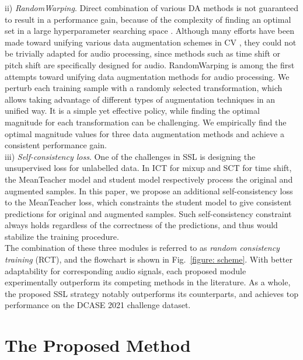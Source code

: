 \documentclass[a4paper]{article}
\begin{document}
\indent ii) \emph{RandomWarping}. Direct combination of various DA methods is not guaranteed to result in a performance gain, because of the complexity of finding an optimal set in a large hyperparameter searching space \cite{shorten2019survey}. Although many efforts have been made toward unifying various data augmentation schemes in CV \cite{cubuk2019autoaugment, cubuk2020randaugment}, they could not be trivially adapted for audio processing, since methods such as time shift \cite{koh2021sound} or pitch shift \cite{mcfee2015software} are specifically designed for audio. RandomWarping is among the first attempts toward unifying data augmentation methods for audio processing. We perturb each training sample with a randomly selected transformation, which allows taking advantage of different types of augmentation techniques in an unified way. It is a simple yet effective policy, while finding the optimal magnitude for each transformation can be challenging. We empirically find the optimal magnitude values for three data augmentation methods and achieve a consistent performance gain. \\
\indent iii) \emph{Self-consistency loss}. One of the challenges in SSL is designing the unsupervised loss for unlabelled data. In ICT \cite{verma2019interpolation} for mixup and SCT \cite{koh2021sound} for time shift, the MeanTeacher model and student model respectively process the original and augmented samples. In this paper, we propose an additional self-consistency loss to the MeanTeacher loss, which constraints the student model to give consistent predictions for original and augmented samples. Such self-consistency constraint always holds regardless of the correctness of the predictions, and thus would stabilize the training procedure. \\
\indent The combination of these three modules is referred to as \emph{random consistency training} (RCT), and the flowchart is shown in Fig.~\ref{figure: scheme}. With better adaptability for corresponding audio signals, each proposed module experimentally outperform its competing methods in the literature. As a whole, the proposed SSL strategy notably outperforms its counterparts, and achieves top performance on the DCASE 2021 challenge dataset. 

\section{The Proposed Method}
\label{sec:pagestyle}
\end{document}
